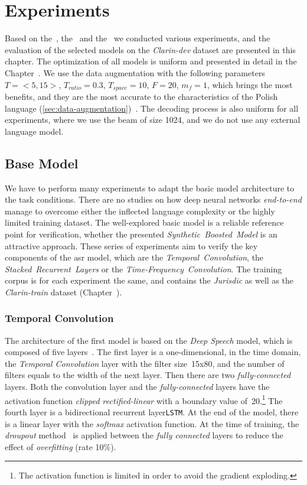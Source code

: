 
\chapter{Experiments}\label{ch:experiments}

Based on the~, the~ and the~ we conducted various experiments,
and the evaluation of the selected models on the \textit{Clarin-dev} dataset are presented in this chapter.
The optimization of all models is uniform and presented in detail in the Chapter~.
We use the data augmentation with the following parameters $T=<5, 15>$, $T_{ratio}=0.3$, $T_{space}=10$, $F=20$, $m_f=1$,
which brings the most benefits, and they are the most accurate to the characteristics of
the Polish language (\ref{sec:data-augmentation})~\cite{igras2013}.
The decoding process is also uniform for all experiments, where
we use the beam of size 1024, and we do not use any external language model.


\section{Base Model}\label{sec:base-model}

We have to perform many experiments to adapt the basic model architecture
to the task conditions.
There are no studies on how deep neural networks \textit{end-to-end} manage to overcome
either the inflected language complexity or the highly limited training dataset.
The well-explored basic model is a reliable reference point for verification,
whether the presented \textit{Synthetic~Boosted~Model} is an attractive approach.
These series of experiments aim to verify the key components of the \acrshort{asr} model, which are
the \textit{Temporal~Convolution}, the \textit{Stacked~Recurrent~Layers} or the \textit{Time-Frequency~Convolution}.
The training corpus is for each experiment the same, and contains the \textit{Jurisdic}
as well as the \textit{Clarin-train} dataset (Chapter~).

\subsection*{Temporal Convolution}

The architecture of the first model is based on the \textit{Deep Speech} model, which is composed of five layers~\cite{hannun2014}.
The first layer is a one-dimensional, in the time domain, the \textit{Temporal Convolution} layer with
the filter size~15x80, and the number of filters equals to the width of the next layer.
Then there are two \textit{fully-connected} layers.
Both the convolution layer and the \textit{fully-connected} layers have the activation function
\textit{clipped rectified-linear} with a boundary value of~20.\footnote{
The activation function is limited in order to avoid the gradient exploding.}
The fourth layer is a bidirectional recurrent layer\texttt{LSTM}.
At the end of the model, there is a linear layer with the \textit{softmax} activation function.
At the time of training, the \textit{droupout} method~\cite{srivastava2014} is applied between
the \textit{fully connected} layers to reduce the effect of \textit{overfitting} (rate 10\%).

